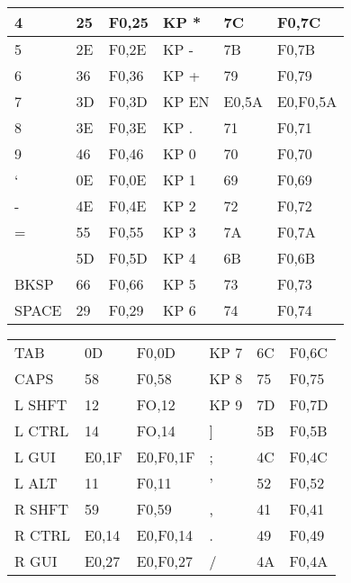 \begin{center}
\begin{tabular}{ | l | l | l | l | l | l | }
	    4 & 25 & F0,25 & KP * & 7C & F0,7C         \\ \hline
	    5 & 2E & F0,2E & KP - & 7B & F0,7B         \\ \hline
	    6 & 36 & F0,36 & KP + & 79 & F0,79         \\ \hline
	    7 & 3D & F0,3D & KP EN & E0,5A & E0,F0,5A  \\ \hline
	    8 & 3E & F0,3E & KP . & 71 & F0,71         \\ \hline
	    9 & 46 & F0,46 & KP 0 & 70 & F0,70         \\ \hline
	    ` & 0E & F0,0E & KP 1 & 69 & F0,69         \\ \hline
	    - & 4E & F0,4E & KP 2 & 72 & F0,72         \\ \hline
	    = & 55 & F0,55 & KP 3 & 7A & F0,7A         \\ \hline
	    \ & 5D & F0,5D & KP 4 & 6B & F0,6B         \\ \hline
	    BKSP &   66 & F0,66 & KP 5 & 73 & F0,73    \\ \hline
	    SPACE &  29 & F0,29 & KP 6 & 74 & F0,74    \\ \hline
  \end{tabular}
\end{center}

\begin{center}
  \begin{tabular}{ | l | l | l | l | l | l | }
    \hline
	    \kword{KEY} & \kword{MAKE} & \kword{BREAK} & \kword{KEY} & \kword{MAKE} & \kword{BREAK} \\ \hline
	    TAB  &   0D & F0,0D & KP 7 & 6C & F0,6C    \\ \hline
	    CAPS  &  58 & F0,58 & KP 8 & 75 & F0,75    \\ \hline
	    L SHFT & 12 & FO,12 & KP 9 & 7D & F0,7D    \\ \hline
	    L CTRL & 14 & FO,14 & ] & 5B & F0,5B       \\ \hline
	    L GUI  & E0,1F & E0,F0,1F & ; & 4C & F0,4C \\ \hline
	    L ALT  & 11 & F0,11 & ' & 52 & F0,52       \\ \hline
	    R SHFT & 59 & F0,59 & , & 41 & F0,41       \\ \hline
	    R CTRL & E0,14 & E0,F0,14 & . & 49 & F0,49 \\ \hline
	    R GUI  & E0,27 & E0,F0,27 & / & 4A & F0,4A \\ \hline
  \end{tabular}
\end{center}

